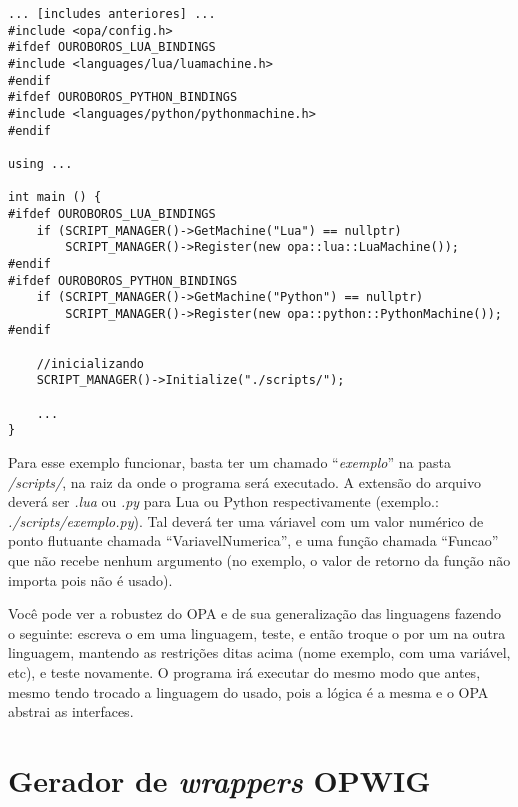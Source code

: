 \begin{lstlisting}
... [includes anteriores] ...
#include <opa/config.h>
#ifdef OUROBOROS_LUA_BINDINGS
#include <languages/lua/luamachine.h>
#endif
#ifdef OUROBOROS_PYTHON_BINDINGS
#include <languages/python/pythonmachine.h>
#endif

using ...

int main () {
#ifdef OUROBOROS_LUA_BINDINGS
    if (SCRIPT_MANAGER()->GetMachine("Lua") == nullptr)
        SCRIPT_MANAGER()->Register(new opa::lua::LuaMachine());    
#endif
#ifdef OUROBOROS_PYTHON_BINDINGS
    if (SCRIPT_MANAGER()->GetMachine("Python") == nullptr)
        SCRIPT_MANAGER()->Register(new opa::python::PythonMachine());
#endif

    //inicializando
    SCRIPT_MANAGER()->Initialize("./scripts/");
    
    ...
}
\end{lstlisting}

Para esse exemplo funcionar, basta ter um \script{} chamado ``\textit{exemplo}''
na pasta \textit{/scripts/}, na raiz da onde o programa será executado. A extensão
do arquivo deverá ser \textit{.lua} ou \textit{.py} para Lua ou Python respectivamente
(exemplo.: \textit{./scripts/exemplo.py}). Tal \script{} deverá ter uma váriavel
com um valor numérico de ponto flutuante chamada ``VariavelNumerica'', e uma função
chamada ``Funcao'' que não recebe nenhum argumento (no exemplo, o valor de retorno da
função não importa pois não é usado).

Você pode ver a robustez do OPA e de sua generalização das linguagens fazendo o seguinte:
escreva o \script{} em uma linguagem, teste, e então troque o \script{} por um na
outra linguagem, mantendo as restrições ditas acima (nome exemplo,  com uma variável, etc),
e teste novamente. O programa irá executar do mesmo modo que antes, mesmo tendo trocado a
linguagem do \script{} usado, pois a lógica é a mesma e o OPA abstrai as interfaces.


\section{Gerador de \emph{wrappers} \textbf{OPWIG}}
\label{sec:resultados:opwig}

